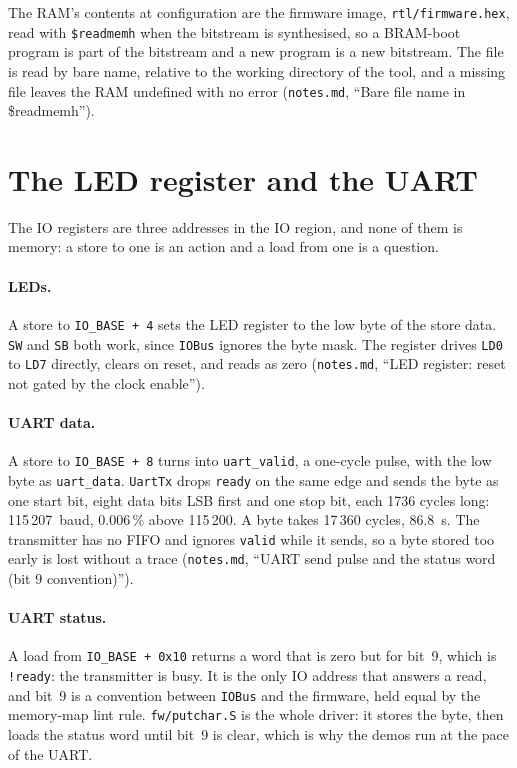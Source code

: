 \documentclass[11pt,a4paper]{report}
\newcommand{\notes}[1]{(\texttt{notes.md}, ``#1'')}
\begin{document}
The RAM's contents at configuration are the firmware image, \texttt{rtl/firmware.hex}, read
with \texttt{\$readmemh} when the bitstream is synthesised, so a BRAM-boot program is part
of the bitstream and a new program is a new bitstream. The file is read by bare name,
relative to the working directory of the tool, and a missing file leaves the RAM undefined
with no error \notes{Bare file name in \$readmemh}.

\section{The LED register and the UART}

The IO registers are three addresses in the IO region, and none of them is memory: a store
to one is an action and a load from one is a question.

\paragraph{LEDs.} A store to \texttt{IO\_BASE + 4} sets the LED register to the low byte of
the store data. \texttt{SW} and \texttt{SB} both work, since \texttt{IOBus} ignores the byte
mask. The register drives \texttt{LD0} to \texttt{LD7} directly, clears on reset, and reads
as zero \notes{LED register: reset not gated by the clock enable}.

\paragraph{UART data.} A store to \texttt{IO\_BASE + 8} turns into \texttt{uart\_valid}, a
one-cycle pulse, with the low byte as \texttt{uart\_data}. \texttt{UartTx} drops
\texttt{ready} on the same edge and sends the byte as one start bit, eight data bits LSB
first and one stop bit, each 1736 cycles long: 115\,207~baud, 0.006\,\% above 115\,200. A
byte takes 17\,360 cycles, 86.8~\textmu s. The transmitter has no FIFO and ignores
\texttt{valid} while it sends, so a byte stored too early is lost without a trace
\notes{UART send pulse and the status word (bit 9 convention)}.

\paragraph{UART status.} A load from \texttt{IO\_BASE + 0x10} returns a word that is zero
but for bit~9, which is \texttt{!ready}: the transmitter is busy. It is the only IO address
that answers a read, and bit~9 is a convention between \texttt{IOBus} and the firmware,
held equal by the memory-map lint rule. \texttt{fw/putchar.S} is the whole driver: it
stores the byte, then loads the status word until bit~9 is clear, which is why the demos
run at the pace of the UART.
\end{document}

